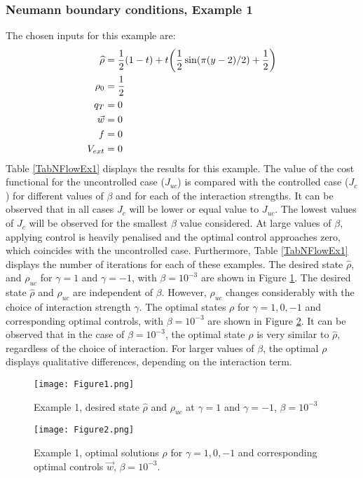 \subsubsection{Neumann boundary conditions, Example 1}	 
The chosen inputs for this example are:
\begin{align*}
\widehat \rho &= \frac{1}{2}(1-t) + t\bigg(\frac{1}{2}\sin(\pi (y - 2)/2) + \frac{1}{2}\bigg)\\
\rho_{0} &= \frac{1}{2}\\
q_{T} &= 0\\
\vec{w} &= 0\\
f &=0\\
V_{ext} &=0
\end{align*}	
Table \ref{TabNFlowEx1} displays the results for this example. The value of the cost functional for the uncontrolled case ($J_{uc}$) is compared with the controlled case ($J_{c}$) for different values of $\beta$ and for each of the interaction strengths. It can be observed that in all cases $J_{c}$ will be lower or equal value to $J_{uc}$. The lowest values of $J_{c}$ will be observed for the smallest $\beta$ value considered. At large values of $\beta$, applying control is heavily penalised and the optimal control approaches zero, which coincides with the uncontrolled case. Furthermore, Table \ref{TabNFlowEx1} displays the number of iterations for each of these examples. The desired state $\widehat \rho$, and $\rho_{uc}$ for $\gamma =1$ and $\gamma = -1$, with $\beta =10^{-3}$ are shown in Figure \ref{Ex12DN1}. The desired state $\hat \rho$ and $\rho_{uc}$ are independent of $\beta$. However, $\rho_{uc}$ changes considerably with the choice of interaction strength $\gamma$. The optimal states $\rho$ for $\gamma = 1,0,-1$ and corresponding optimal controls, with $\beta = 10^{-3}$ are shown in Figure \ref{Ex12DN2}. 
It can be observed that in the case of $\beta = 10^{-3}$, the optimal state $\rho$ is very similar to $\hat \rho$, regardless of the choice of interaction. For larger values of $\beta$, the optimal $\rho$ displays qualitative differences, depending on the interaction term. 
\begin{figure}[h]
	\texttt{[image: Figure1.png]}
	\caption{Example 1, desired state $\widehat \rho$ and $\rho_{uc}$ at $\gamma =1$ and $\gamma =-1$, $\beta = 10^{-3}$}
	\label{Ex12DN1}
\end{figure}
\begin{figure}[h]
	\texttt{[image: Figure2.png]}
	\caption{Example 1, optimal solutions $\rho$ for $\gamma = 1,0,-1$ and corresponding optimal controls $\vec{w}$, $\beta = 10^{-3}$.}
	\label{Ex12DN2}
\end{figure}


